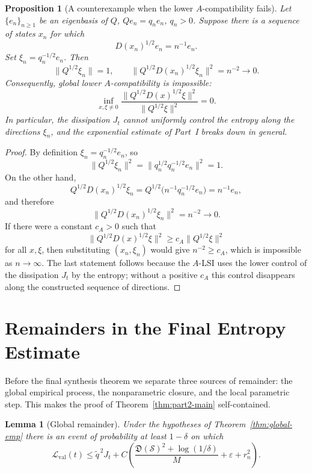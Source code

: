 \documentclass{article}
\newtheorem{lemma}[theorem]{Lemma}
\newtheorem{proposition}[theorem]{Proposition}
\newcommand{\Eval}{\mathcal L_{\mathrm{val}}}
\begin{document}
\begin{proposition}[A counterexample when the lower \(A\)-compatibility fails]
\label{prop:nondegeneracy-counterexample}
Let \(\{e_n\}_{n\ge1}\) be an eigenbasis of \(Q\), \(Qe_n=q_ne_n\), \(q_n>0\).
Suppose there is a sequence of states \(x_n\) for which
\[
        D(x_n)^{1/2}e_n=n^{-1}e_n .
\]
Set \(\xi_n=q_n^{-1/2}e_n\). Then
\[
        \|Q^{1/2}\xi_n\|=1,
        \qquad
        \|Q^{1/2}D(x_n)^{1/2}\xi_n\|^2=n^{-2}\to0 .
\]
Consequently, global lower \(A\)-compatibility is impossible:
\[
        \inf_{x,\xi\ne0}
        \frac{\|Q^{1/2}D(x)^{1/2}\xi\|^2}{\|Q^{1/2}\xi\|^2}=0 .
\]
In particular, the dissipation \(J_t\) cannot uniformly control the entropy along
the directions \(\xi_n\), and the exponential estimate of Part~I breaks down in
general.
\end{proposition}

\begin{proof}
By definition \(\xi_n=q_n^{-1/2}e_n\), so
\[
        \|Q^{1/2}\xi_n\|^2
        =\|q_n^{1/2}q_n^{-1/2}e_n\|^2=1 .
\]
On the other hand,
\[
        Q^{1/2}D(x_n)^{1/2}\xi_n
        =Q^{1/2}\bigl(n^{-1}q_n^{-1/2}e_n\bigr)
        =n^{-1}e_n,
\]
and therefore
\[
        \|Q^{1/2}D(x_n)^{1/2}\xi_n\|^2=n^{-2}\to0 .
\]
If there were a constant \(c_A>0\) such that
\[
        \|Q^{1/2}D(x)^{1/2}\xi\|^2
        \ge c_A\|Q^{1/2}\xi\|^2
\]
for all \(x,\xi\), then substituting \((x_n,\xi_n)\) would give
\(n^{-2}\ge c_A\), which is impossible as \(n\to\infty\). The last statement
follows because the \(A\)-LSI uses the lower control of the dissipation \(J_t\) by
the entropy; without a positive \(c_A\) this control disappears along the
constructed sequence of directions.
\end{proof}



\section{Remainders in the Final Entropy Estimate}
\label{sec:residual-lemmas}

Before the final synthesis theorem we separate three sources of remainder: the
global empirical process, the nonparametric closure, and the local parametric
step. This makes the proof of Theorem~\ref{thm:part2-main} self-contained.

\begin{lemma}[Global remainder]
\label{lem:global-residual}
Under the hypotheses of Theorem~\ref{thm:global-emp} there is an event of
probability at least \(1-\delta\) on which
\[
        \Eval(t)\le \widetilde q^{\,2}J_t+
        C\left(
        \frac{\mathfrak D(\mathcal S)^2+\log(1/\delta)}{M}
        +\varepsilon+r_n^2\right).
\]
\end{lemma}
\end{document}
